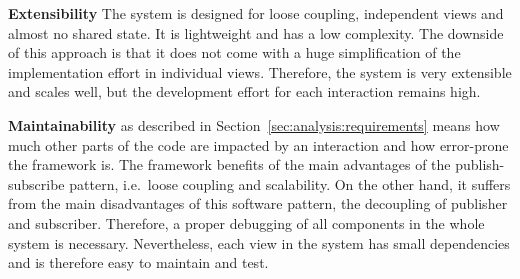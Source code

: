 \textbf{Extensibility}
The \cmv{} system is designed for loose coupling, independent views and almost no shared state.
It is lightweight and has a low complexity.
The downside of this approach is that it does not come with a huge simplification of the implementation effort in individual views.
Therefore, the system is very extensible and scales well, but the development effort for each interaction remains high.

\textbf{Maintainability} as described in Section~\ref{sec:analysis:requirements} means how much other parts of the code are impacted by an interaction and how error-prone the framework is.
The framework benefits of the main advantages of the publish-subscribe pattern, i.e.\ loose coupling and scalability.
On the other hand, it suffers from the main disadvantages of this software pattern, the decoupling of publisher and subscriber.
Therefore, a proper debugging of all components in the whole system is necessary.
Nevertheless, each view in the \cmv{} system has small dependencies and is therefore easy to maintain and test.


